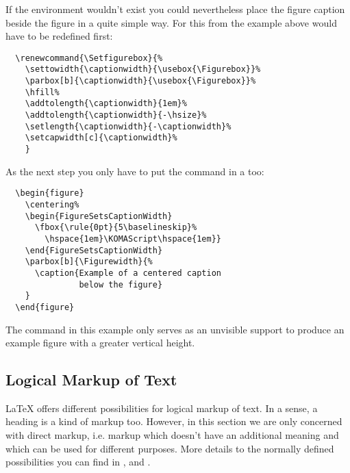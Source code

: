\begin{Example}
  If the  environment wouldn't exist you
  could nevertheless place the figure caption beside the figure in a
  quite simple way. For this  from the example
  above would have to be redefined first:
\begin{lstlisting}
  \renewcommand{\Setfigurebox}{%
    \settowidth{\captionwidth}{\usebox{\Figurebox}}%
    \parbox[b]{\captionwidth}{\usebox{\Figurebox}}%
    \hfill%
    \addtolength{\captionwidth}{1em}%
    \addtolength{\captionwidth}{-\hsize}%
    \setlength{\captionwidth}{-\captionwidth}%
    \setcapwidth[c]{\captionwidth}%
    }
\end{lstlisting}
  As the next step you only have to put the  command in
  a  too:
\begin{lstlisting}
  \begin{figure}
    \centering%
    \begin{FigureSetsCaptionWidth}
      \fbox{\rule{0pt}{5\baselineskip}%
        \hspace{1em}\KOMAScript\hspace{1em}}
    \end{FigureSetsCaptionWidth}
    \parbox[b]{\Figurewidth}{%
      \caption{Example of a centered caption
               below the figure}
    }
  \end{figure}
\end{lstlisting}
  The  command in this example only serves as an unvisible
  support to produce an example figure with a greater vertical height.
\end{Example}
%
%
%
%


\subsection{Logical Markup of Text}
\label{sec:maincls.emphasis}

\begin{Explain}
  \LaTeX{} offers different possibilities for logical
  markup of text. In a sense, a 
  heading is a kind of markup too. However, in this section we are
  only concerned with direct markup, i.e. markup which doesn't have an
  additional meaning and which can be used for different
  purposes. More details to the normally defined possibilities you can
  find in \cite{lshort}, \cite{latex:usrguide} and
  \cite{latex:fntguide}.
\end{Explain}

